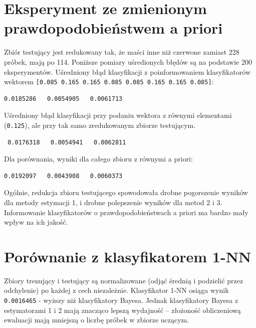 \documentclass[a4paper]{article}
\begin{document}
\section{Eksperyment ze zmienionym prawdopodobieństwem a priori}
Zbiór testujący jest redukowany tak, że maści inne niż czerwone zamiast 228 próbek, mają po 114.
Poniższe pomiary uśredionych błędów są na podstawie 200 eksperymentów.
Uśredniony błąd klasyfikacji z poinformowaniem klasyfikatorów wektorem \texttt{[0.085 0.165 0.165 0.085 0.085 0.165 0.165 0.085]}:
\begin{verbatim}
0.0185286   0.0054905   0.0061713
\end{verbatim}
Uśredniony błąd klasyfikacji przy podaniu wektora z równymi elementami (\texttt{0.125}),
ale przy tak samo zredukowanym zbiorze testującym.
\begin{verbatim}
 0.0176318   0.0054941   0.0062811
\end{verbatim}
Dla porównania, wyniki dla całego zbioru z równymi a priori:
\begin{verbatim}
0.0192097   0.0043908   0.0060373
\end{verbatim}
Ogólnie, redukcja zbioru testującego spowodowała drobne pogorszenie wyników dla metody estymacji 1,
i drobne polepszenie wyników dla metod 2 i 3.
Informowanie klasyfikatorów o prawdopodobieństwach a priori ma bardzo mały wpływ na ich jakość.


\section{Porównanie z klasyfikatorem 1-NN}
Zbiory trenujący i testujący są normalizowane (odjąć średnią i podzielić przez odchylenie) po każdej z cech niezależnie.
Klasyfikator 1-NN osiąga wynik \texttt{0.0016465} - wyższy niż klasyfikatory Bayesa.
Jednak klasyfikatory Bayesa z estymatorami 1 i 2 mają znacząco lepszą wydajność --
złożoność obliczeniową ewaluacji mają mniejszą o liczbę próbek w zbiorze uczącym.
\end{document}
